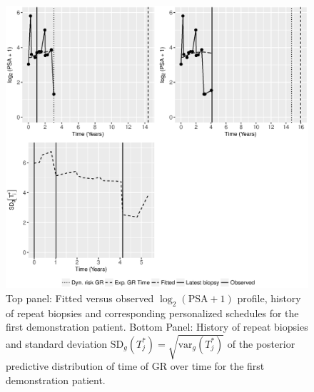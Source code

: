 \begin{figure}
\centerline{
\includegraphics[width=\columnwidth]{images/prias_demo/case_911_t3_log2psa_plus1.eps}
}
\caption{Top panel: Fitted versus observed $\log_2 (\mbox{PSA} + 1)$ profile, history of repeat biopsies and corresponding personalized schedules for the first demonstration patient. Bottom Panel: History of repeat biopsies and standard deviation $\mbox{SD}_g(T^*_j) = \sqrt{\mbox{var}_g(T^*_j)}$ of the posterior predictive distribution of time of GR over time for the first demonstration patient.}
\label{fig : prias_demo_pid_911}
\end{figure}